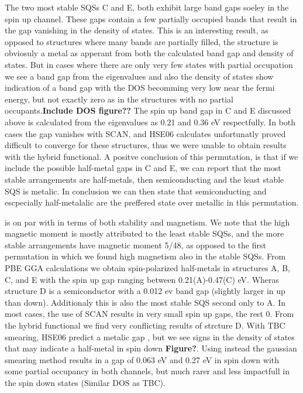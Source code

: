 The two most stable SQSs C and E, both exhibit large band gaps soeley in the spin up channel. These gaps contain a few partially occupied bands that result in the gap vanishing in the density of states. This is an interesting result, as opposed to structures where many bands are partially filled, the structure is obviosuly a metal as apperant from both the calculated band gap and density of states. But in cases where there are only very few states with partial occupation we see a band gap from the eigenvalues and also the density of states show indication of a band gap with the DOS becomming very low near the fermi energy, but not exactly zero as in the structures with no partial occupants.\textbf{Include DOS figure??} The spin up band gap in C and E discussed above is calculated from the eigenvalues as 0.21 and 0.36 eV respectfully. In both cases the gap vanishes with SCAN, and HSE06 calculates unfortunatly proved difficult to converge for these structures, thus we were unable to obtain results with the hybrid functional. A positve conclusion of this permutation, is that if we include the possible half-metal gaps in C and E, we can report that the most stable arrangements are half-metals, then semiconducting and the least stable SQS is metalic. In conclusion we can then state that semiconducting and escpecially half-metalalic are the preffered state over metallic in this permutation.     

 is on par with  in terms of both stability and magnetism. We note that the high magnetic moment is mostly attributed to the least stable SQSs, and the more stable arrangements have magnetic moment 5/48, as opposed to the first permutation in which we found high magnetism also in the stable SQSs. From PBE GGA calculations we obtain spin-polarized half-metals in structures A, B, C, and E with the spin up gap ranging between 0.21(A)-0.47(C) eV. Wheras structure D is a semiconductor with a 0.012 ev band gap (slightly larger in up than down). Additionaly this is also the most stable SQS second only to A. In most cases, the use of SCAN results in very small spin up gaps, the rest 0. From the hybrid functional we find very conflicting results of strcture D. With TBC smearing, HSE06 predict a metalic gap , but  we see signs in the density of states that may indicate a half-metal in spin down \textbf{Figure?}. Using instead the gaussian smearing method results in a gap of 0.063 eV and 0.27 eV in spin down with some partial occupancy in both channels, but much rarer and less impactfull in the spin down states (Similar DOS as TBC).        


